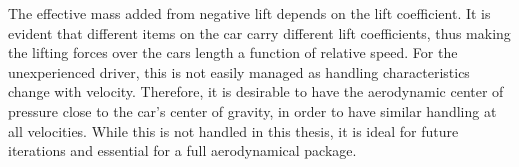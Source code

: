   The effective mass added from negative lift depends on the lift coefficient. It is evident that different items on the car carry different lift coefficients, thus making the lifting forces over the cars length a function of relative speed. For the unexperienced driver, this is not easily managed as handling characteristics change with velocity. Therefore, it is desirable to have the aerodynamic center of pressure close to the car's center of gravity, in order to have similar handling at all velocities. While this is not handled in this thesis, it is ideal for future iterations and essential for a full aerodynamical package.

